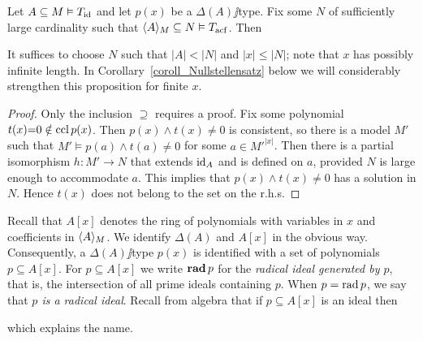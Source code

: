 \documentclass[creche.tex]{subfiles}
\begin{document}
\begin{proposition}\label{prop_Nullstellensatz}
Let $A\subseteq M\models T_{\rm id}$ and let $p(x)$ be a $\Delta(A)\jj$type. Fix some $N$ of sufficiently large cardinality such that $\<A\>_M\subseteq N\models T_{\rm acf}$. Then 


\end{proposition}

It suffices to choose $N$ such that $|A|<|N|$ and $|x|\le |N|$; note that $x$ has possibly infinite length. In Corollary~\ref{coroll_Nullstellensatz} below we will considerably strengthen this proposition for finite $x$.

\begin{proof} Only the inclusion $\supseteq$ requires a proof.  Fix some polynomial $t(x){=}0\notin\ccl\, p(x)$. Then $p(x)\wedge t(x)\neq0$ is consistent, so there is a model $M'$ such that $M'\models p(a)\wedge t(a)\neq0$ for some $a\in {M'}^{|x|}$. Then there is a partial isomorphism $h:M'\to N$ that extends $\id_A$ and is defined on $a$, provided $N$ is large enough to accommodate $a$. This implies that $p(x)\wedge t(x)\neq0$ has a solution in $N$. Hence $t(x)$ does not belong to the set on the r.h.s.  
\end{proof}

Recall that $A[x]$ denotes the ring of polynomials with variables in $x$ and coefficients in $\<A\>_M$. We identify $\Delta(A)$ and $A[x]$ in the obvious way. Consequently, a $\Delta(A)\jj$type $p(x)$ is identified with a set of polynomials $p\subseteq A[x]$. For $p\subseteq A[x]$ we write \emph{${\rm\bf rad}\,p$} for the \emph{radical ideal generated by $p$}, that is, the intersection of all prime ideals containing $p$. When $p=\rad p$, we say that  \emph{$p$ is a radical ideal}. Recall from algebra that if $p\subseteq A[x]$ is an ideal then


which explains the name.
\end{document}
